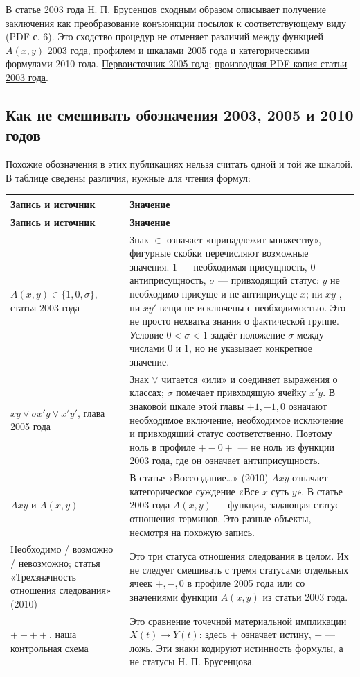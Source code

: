 \documentclass[12pt,a4paper]{article}
\begin{document}
В статье 2003 года Н. П. Брусенцов сходным образом описывает получение заключения как преобразование конъюнкции посылок к соответствующему виду (PDF с. 6). Это сходство процедур не отменяет различий между функцией \(A(x,y)\) 2003 года, профилем и шкалами 2005 года и категорическими формулами 2010 года. \href{../sources/pdfs/Брусенцов_Реанимация-аристотелевой-силлогистики_2005-глава-из-Реставрации-логики.pdf}{Первоисточник 2005 года}; \href{../sources/pdfs/Брусенцов_Трехзначная-интерпретация-силлогистики-Аристотеля_2003_версия-музея.pdf}{производная PDF-копия статьи 2003 года}.

\subsection{Как не смешивать обозначения 2003, 2005 и 2010 годов}

Похожие обозначения в этих публикациях нельзя считать одной и той же шкалой. В таблице сведены различия, нужные для чтения формул:

\begin{longtable}{P{.28\linewidth}P{.66\linewidth}}
\toprule
\textbf{Запись и источник} & \textbf{Значение} \\
\midrule
\endfirsthead
\toprule
\textbf{Запись и источник} & \textbf{Значение} \\
\midrule
\endhead
\(A(x,y)\in\{1,0,\sigma\}\), статья 2003 года & Знак \(\in\) означает «принадлежит множеству», фигурные скобки перечисляют возможные значения. \(1\) — необходимая присущность, \(0\) — антиприсущность, \(\sigma\) — привходящий статус: \(y\) не необходимо присуще и не антиприсуще \(x\); ни \(xy\)-, ни \(xy'\)-вещи не исключены с необходимостью. Это не просто нехватка знания о фактической группе. Условие \(0<\sigma<1\) задаёт положение \(\sigma\) между числами 0 и 1, но не указывает конкретное значение. \\
\(xy\lor\sigma x'y\lor x'y'\), глава 2005 года & Знак \(\lor\) читается «или» и соединяет выражения о классах; \(\sigma\) помечает привходящую ячейку \(x'y\). В знаковой шкале этой главы \(+1,-1,0\) означают необходимое включение, необходимое исключение и привходящий статус соответственно. Поэтому ноль в профиле \(+-0+\) — не ноль из функции 2003 года, где он означает антиприсущность. \\
\(Axy\) и \(A(x,y)\) & В статье «Воссоздание…» (2010) \(Axy\) означает категорическое суждение «Все \(x\) суть \(y\)». В статье 2003 года \(A(x,y)\) — функция, задающая статус отношения терминов. Это разные объекты, несмотря на похожую запись. \\
Необходимо / возможно / невозможно; статья «Трехзначность отношения следования» (2010) & Это три статуса отношения следования в целом. Их не следует смешивать с тремя статусами отдельных ячеек \(+,-,0\) в профиле 2005 года или со значениями функции \(A(x,y)\) из статьи 2003 года. \\
\(+-++\), наша контрольная схема & Это сравнение точечной материальной импликации \(X(t)\to Y(t)\): здесь \(+\) означает истину, \(-\) — ложь. Эти знаки кодируют истинность формулы, а не статусы Н. П. Брусенцова. \\
\bottomrule
\end{longtable}
\end{document}
